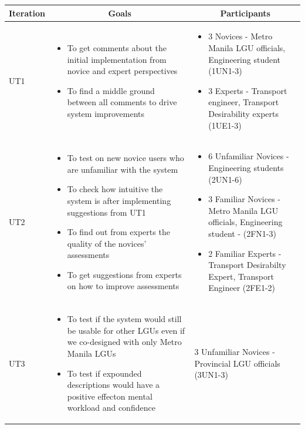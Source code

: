 \documentclass{sigchi}
\begin{document}
\begin{table}[!htbp]
\small
    \centering
    \begin{tabular}{p{}|p{}|p{}}
    \toprule
        \multicolumn{1}{c}{Iteration} & 
        \multicolumn{1}{c}{Goals} & 
        \multicolumn{1}{c}{Participants} \\
        \midrule
        UT1 & 
        \begin{itemize}
            \item To get comments about the initial implementation from novice and expert perspectives
            \item To find a middle ground between all comments to drive system improvements
        \end{itemize} 
        & \begin{itemize}
            \item 3 Novices - Metro Manila LGU officials, Engineering student (1UN1-3) 
            \item 3 Experts - Transport engineer, Transport Desirability experts (1UE1-3) 
        \end{itemize}\\ \hline
        
        UT2 &
        \begin{itemize}
            \item To test on new novice users who are unfamiliar with the system
            \item To check how intuitive the system is after implementing suggestions from UT1
            \item To find out from experts the quality of the novices' assessments
            \item To get suggestions from experts on how to improve assessments
        \end{itemize}
        & \begin{itemize}
            \item 6 Unfamiliar Novices - Engineering students (2UN1-6)
            \item 3 Familiar Novices - Metro Manila LGU officials, Engineering student - (2FN1-3)
            \item 2 Familiar Experts - Transport Desirabilty Expert, Transport Engineer (2FE1-2)
        \end{itemize} \\ \hline
        
        UT3 &
        \begin{itemize}
            \item To test if the system would still be usable for other LGUs even if we co-designed with only Metro Manila LGUs
            \item To test if expounded descriptions would have a positive effecton mental workload and confidence
        \end{itemize}
        & 3 Unfamiliar Novices - Provincial LGU officials (3UN1-3) \\
        \hline
        

\end{tabular}
\end{table}
\end{document}
